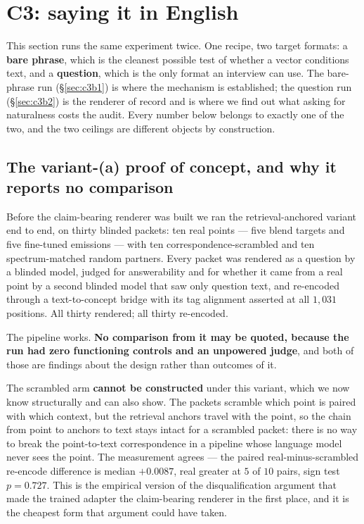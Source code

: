 \documentclass[11pt]{article}
\begin{document}
\section{C3: saying it in English}
\label{sec:c3}

This section runs the same experiment twice. One recipe, two target formats: a \textbf{bare phrase},
which is the cleanest possible test of whether a vector conditions text, and a \textbf{question},
which is the only format an interview can use. The bare-phrase run (\S\ref{sec:c3b1}) is where the
mechanism is established; the question run (\S\ref{sec:c3b2}) is the renderer of record and is where
we find out what asking for naturalness costs the audit. Every number below belongs to exactly one
of the two, and the two ceilings are different objects by construction.

\subsection{The variant-(a) proof of concept, and why it reports no comparison}

Before the claim-bearing renderer was built we ran the retrieval-anchored variant end to end, on
thirty blinded packets: ten real points --- five blend targets and five fine-tuned emissions --- with
ten correspondence-scrambled and ten spectrum-matched random partners. Every packet was rendered as a
question by a blinded model, judged for answerability and for whether it came from a real point by a
second blinded model that saw only question text, and re-encoded through a text-to-concept bridge with
its tag alignment asserted at all $1{,}031$ positions. All thirty rendered; all thirty re-encoded.

The pipeline works. \textbf{No comparison from it may be quoted, because the run had zero functioning
controls and an unpowered judge}, and both of those are findings about the design rather than
outcomes of it.

The scrambled arm \textbf{cannot be constructed} under this variant, which we now know structurally
and can also show. The packets scramble which point is paired with which context, but the retrieval
anchors travel with the point, so the chain from point to anchors to text stays intact for a scrambled
packet: there is no way to break the point-to-text correspondence in a pipeline whose language model
never sees the point. The measurement agrees --- the paired real-minus-scrambled re-encode difference
is median $+0.0087$, real greater at $5$ of $10$ pairs, sign test $p = 0.727$. This is the empirical
version of the disqualification argument that made the trained adapter the claim-bearing renderer in
the first place, and it is the cheapest form that argument could have taken.
\end{document}
